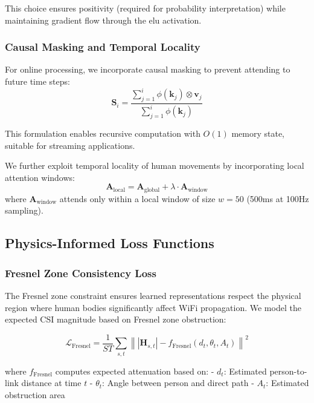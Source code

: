 \documentclass[10pt,journal,compsoc]{IEEEtran}
\begin{document}
This choice ensures positivity (required for probability interpretation) while maintaining gradient flow through the elu activation.

\subsubsection{Causal Masking and Temporal Locality}

For online processing, we incorporate causal masking to prevent attending to future time steps:
\begin{equation}
\mathbf{S}_i = \frac{\sum_{j=1}^{i} \phi(\mathbf{k}_j) \otimes \mathbf{v}_j}{\sum_{j=1}^{i} \phi(\mathbf{k}_j)}
\end{equation}

This formulation enables recursive computation with $O(1)$ memory state, suitable for streaming applications.

We further exploit temporal locality of human movements by incorporating local attention windows:
\begin{equation}
\mathbf{A}_{\text{local}} = \mathbf{A}_{\text{global}} + \lambda \cdot \mathbf{A}_{\text{window}}
\end{equation}
where $\mathbf{A}_{\text{window}}$ attends only within a local window of size $w = 50$ (500ms at 100Hz sampling).

\subsection{Physics-Informed Loss Functions}

\subsubsection{Fresnel Zone Consistency Loss}

The Fresnel zone constraint ensures learned representations respect the physical region where human bodies significantly affect WiFi propagation. We model the expected CSI magnitude based on Fresnel zone obstruction:

\begin{equation}
\mathcal{L}_{\text{Fresnel}} = \frac{1}{ST} \sum_{s,t} \left\| |\mathbf{H}_{s,t}| - f_{\text{Fresnel}}(d_t, \theta_t, A_t) \right\|^2
\end{equation}

where $f_{\text{Fresnel}}$ computes expected attenuation based on:
- $d_t$: Estimated person-to-link distance at time $t$
- $\theta_t$: Angle between person and direct path
- $A_t$: Estimated obstruction area
\end{document}
